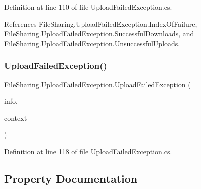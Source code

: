 Definition at line 110 of file Upload\+Failed\+Exception.\+cs.



References File\+Sharing.\+Upload\+Failed\+Exception.\+Index\+Of\+Failure, File\+Sharing.\+Upload\+Failed\+Exception.\+Successful\+Downloads, and File\+Sharing.\+Upload\+Failed\+Exception.\+Unsuccessful\+Uploads.

\mbox{\label{class_file_sharing_1_1_upload_failed_exception_af7a1ae41c23fd2ed6d955000f452ecdd}} 
\subsubsection{\texorpdfstring{Upload\+Failed\+Exception()}{UploadFailedException()}\hspace{0.1cm}{\footnotesize\ttfamily [7/7]}}
{\footnotesize\ttfamily File\+Sharing.\+Upload\+Failed\+Exception.\+Upload\+Failed\+Exception (\begin{DoxyParamCaption}\item[{System.\+Runtime.\+Serialization.\+Serialization\+Info}]{info,  }\item[{System.\+Runtime.\+Serialization.\+Streaming\+Context}]{context }\end{DoxyParamCaption})\hspace{0.3cm}{\ttfamily [protected]}}



Definition at line 118 of file Upload\+Failed\+Exception.\+cs.



\subsection{Property Documentation}
\mbox{\label{class_file_sharing_1_1_upload_failed_exception_a3d23421eb17105a8a7bda2723565a02a}} 
